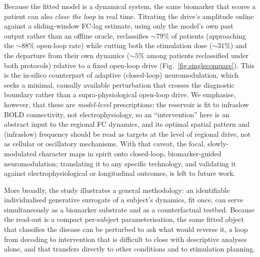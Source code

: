\documentclass[11pt]{article}
\begin{document}
Because the fitted model is a dynamical system, the same biomarker that scores a
patient can also \emph{close the loop} in real time. Titrating the drive's amplitude online against a sliding-window FC-lag estimate, using only the model's own past output rather than an offline oracle, reclassifies $\sim$$79\%$ of patients (approaching the $\sim$$88\%$ open-loop rate) while cutting both the stimulation dose ($\sim$$31\%$) and the departure from their own dynamics ($\sim$$5\%$ among patients reclassified under both protocols) relative to a fixed open-loop drive (Fig.~\ref{fig:singlecompare}). This is the in-silico counterpart of adaptive (closed-loop) neuromodulation, which seeks a minimal, causally available perturbation that crosses the diagnostic boundary rather than a supra-physiological open-loop drive. We emphasise, however, that these are \emph{model-level} prescriptions:
the reservoir is fit to infraslow BOLD connectivity, not electrophysiology, so an
``intervention'' here is an abstract input to the regional FC dynamics, and its
optimal spatial pattern and (infraslow) frequency should be read as targets at the
level of regional drive, not as cellular or oscillatory mechanisms. With that
caveat, the focal, slowly-modulated character maps in spirit onto closed-loop,
biomarker-guided neuromodulation; translating it to any specific
technology, and validating it against electrophysiological or longitudinal
outcomes, is left to future work.

More broadly, the study illustrates a general methodology: an identifiable
individualised generative surrogate of a subject's dynamics, fit once, can serve
simultaneously as a biomarker substrate and as a counterfactual testbed. Because
the read-out is a compact per-subject parameterisation, the same fitted object
that classifies the disease can be perturbed to ask what would reverse it, a
loop from decoding to intervention that is difficult to close with descriptive
analyses alone, and that transfers directly to other conditions and to
stimulation planning.
\end{document}
